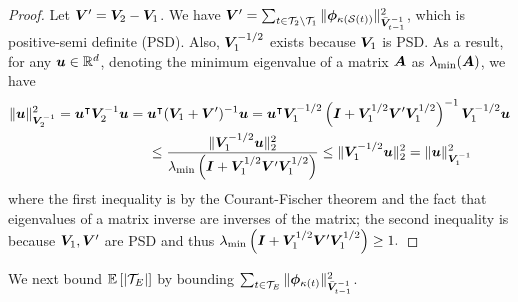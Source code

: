 \begin{proof}
Let $\boldsymbol{V}' = \boldsymbol{V}_2 - \boldsymbol{V}_1$. We have $\boldsymbol{V}' = \sum_{t \in \mathcal{T}_2 \setminus \mathcal{T}_1} \|\boldsymbol{\phi}_{\kappa(\mathcal{S}(t))}\|_{\bar{\boldsymbol{V}}_{t-1}^{-1}}^2$, which is positive-semi definite (PSD). Also, $\boldsymbol{V}_1^{-1/2}$ exists because $\boldsymbol{V}_1$ is PSD. As a result, for any $\boldsymbol{u} \in \mathbb{R}^d$, denoting the minimum eigenvalue of a matrix $\boldsymbol{A}$ as $\lambda_{\min}(\boldsymbol{A})$, we have 
\begin{align*}
\|\bolds{u}\|_{\bV_2^{-1}}^2 = \bolds{u}^{\trans}\bV_2^{-1}\bolds{u} = \bolds{u}^{\trans}(\bV_1+\bV')^{-1}\bolds{u}&=\bolds{u}^{\trans}\bV_1^{-1/2}\left(\bI + \bV_1^{1/2}\bV'\bV_1^{1/2}\right)^{-1}\bV_1^{-1/2}\bolds{u} \\
&\hspace{-1in}\leq \frac{\|\bV_1^{-1/2}\bolds{u}\|_2^2}{\lambda_{\min}\left(\bI + \bV_1^{1/2}\bV'\bV_1^{1/2}\right)} \leq \|\bV_1^{-1/2}\bolds{u}\|_2^2 = \|\bolds{u}\|_{\bV_1^{-1}}^2
\end{align*}
where the first inequality is by the Courant-Fischer theorem and the fact that eigenvalues of a matrix inverse are inverses of the matrix; the second inequality is because $\boldsymbol{V}_1,\boldsymbol{V}'$ are PSD and thus $\lambda_{\min}\left(\boldsymbol{I} + \boldsymbol{V}_1^{1/2}\boldsymbol{V}'\boldsymbol{V}_1^{1/2}\right) \geq 1.$ 
\end{proof}
We next bound $\mathbb E\left[|\mathcal{T}_E|\right]$ by bounding $\sum_{t \in \mathcal{T}_E} \|\boldsymbol{\phi}_{\kappa(t)}\|_{\bar{\boldsymbol{V}}_{t-1}^{-1}}^2$.
